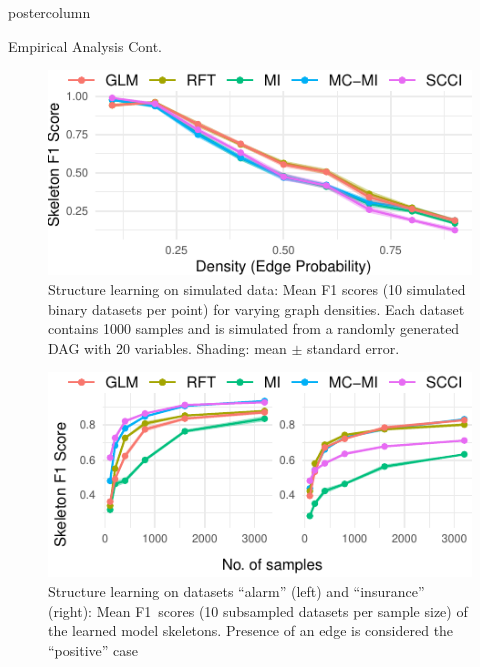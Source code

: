\documentclass{beamer}
\newlength{\columnheight}
\begin{document}
\begin{frame}
\begin{columns}
	\begin{column}{0.33\textwidth}
		\begin{beamercolorbox}[center]{postercolumn}
			\begin{minipage}{.98\textwidth} %
				\parbox[t][\columnheight]{\textwidth}{ %
	\begin{myblock}{Empirical Analysis Cont.}
		\begin{figure}
			\centering
			\includegraphics[scale=3]{../in_person/imgs/sl_density.pdf}
			\caption{Structure learning on simulated data: Mean F1 scores (10
				 simulated binary datasets per point) for varying graph densities. Each
				 dataset contains 1000 samples and is simulated from a randomly
				 generated DAG with 20 variables. Shading: mean $\pm$ standard error.}
			\label{fig:sl_density}
		\end{figure}
		\begin{figure}
			\centering
			\includegraphics[scale=3]{../in_person/imgs/sl.pdf}
			\caption{Structure learning on datasets ``alarm'' (left) and ``insurance'' (right):
				Mean F1~scores (10 subsampled datasets per sample size) of the learned
				model skeletons.  Presence of an edge is considered the ``positive'' case
}
\end{figure}
\end{myblock}}
\end{minipage}
\end{beamercolorbox}
\end{column}
\end{columns}
\end{frame}
\end{document}
